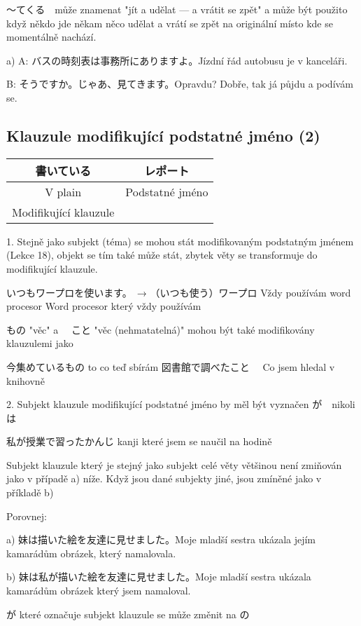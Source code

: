 〜てくる　může znamenat "jít a udělat --- a vrátit se zpět" a může být použito když někdo jde někam něco udělat a vrátí se zpět na originální místo kde se momentálně nachází.

a)
A: バスの時刻表は事務所にありますよ。Jízdní řád autobusu je v kanceláři.

B: そうですか。じゃあ、見てきます。Opravdu? Dobře, tak já půjdu a podívám se.

\subsection{Klauzule modifikující podstatné jméno (2)}
\begin{center}
\begin{tabular}{|c|c|}
書いている　&レポート\\
\hline
V plain&Podstatné jméno\\
Modifikující klauzule&\\
\hline
\end{tabular}
\end{center}

1. Stejně jako subjekt (téma) se mohou stát modifikovaným podstatným jménem (Lekce 18), objekt se tím také může stát, zbytek věty se transformuje do modifikující klauzule.

いつもワープロを使います。　→         （いつも使う）ワープロ
Vždy používám word procesor			Word procesor který vždy používám


もの "věc" a 　こと "věc (nehmatatelná)" mohou být také modifikovány klauzulemi jako 

今集めているもの to co teď sbírám
図書館で調べたこと　 Co jsem hledal v knihovně

2. Subjekt klauzule modifikující podstatné jméno by měl být vyznačen が　nikoli は

私が授業で習ったかんじ kanji které jsem se naučil na hodině

Subjekt klauzule který je stejný jako subjekt celé věty většinou není zmiňován jako v případě a) níže. Když jsou dané subjekty jiné, jsou zmíněné jako v příkladě b)

Porovnej:

a) 妹は描いた絵を友達に見せました。Moje mladší sestra ukázala jejím kamarádům obrázek, který namalovala.

b) 妹は私が描いた絵を友達に見せました。Moje mladší sestra ukázala kamarádům obrázek který jsem namaloval.

が které označuje subjekt klauzule se může změnit na の

